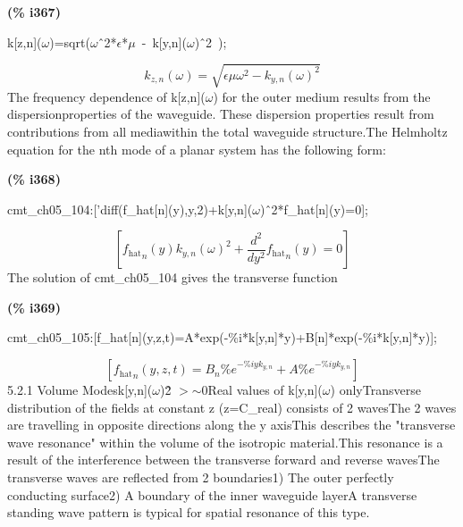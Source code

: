 \documentclass[fleqn]{article}
\begin{document}
\noindent
\begin{minipage}[t]{4.000000em}\color{red}\bfseries
(\% i367)	
\end{minipage}
\begin{minipage}[t]{\textwidth}\color{blue}
k[z,n](\ensuremath{\omega})=sqrt(\ensuremath{\omega}\^\ 2*\ensuremath{\epsilon}*\ensuremath{\mu}\ -\ k[y,n](\ensuremath{\omega})\^\ 2\ );
\end{minipage}
\[\displaystyle \tag{\% o367} 
{k_{z,n}}\left( \omega \right) =\sqrt{\epsilon  \mu  {{\omega }^{2}}-{{{k_{y,n}}\left( \omega \right) }^{2}}}\mbox{}
\]
The frequency dependence of k[z,n](\ensuremath{\omega}) for the outer medium results from the dispersionproperties of the waveguide. These dispersion properties result from contributions from all mediawithin the total waveguide structure.The Helmholtz equation for the nth mode of a planar system has the following form:


\noindent
\begin{minipage}[t]{4.000000em}\color{red}\bfseries
(\% i368)	
\end{minipage}
\begin{minipage}[t]{\textwidth}\color{blue}
cmt\_ch05\_104:['diff(f\_hat[n](y),y,2)+k[y,n](\ensuremath{\omega})\^\ 2*f\_hat[n](y)=0];
\end{minipage}
\[\displaystyle \tag{\% o368} 
\left[ {{{f_{\ensuremath{\mathrm{hat}}}}}_n}(y) {{{k_{y,n}}\left( \omega \right) }^{2}}+\frac{{{d}^{2}}}{d {{y}^{2}}} {{{f_{\ensuremath{\mathrm{hat}}}}}_n}(y)=0\right] \mbox{}
\]
The solution of cmt\_ch05\_104 gives the transverse function


\noindent
\begin{minipage}[t]{4.000000em}\color{red}\bfseries
(\% i369)	
\end{minipage}
\begin{minipage}[t]{\textwidth}\color{blue}
cmt\_ch05\_105:[f\_hat[n](y,z,t)=A*exp(-\%i*k[y,n]*y)+B[n]*exp(-\%i*k[y,n]*y)];
\end{minipage}
\[\displaystyle \tag{\% o369} 
\left[ {{{f_{\ensuremath{\mathrm{hat}}}}}_n}\left( y\operatorname{,}z\operatorname{,}t\right) ={B_n} {{\% e}^{-\% i y {k_{y,n}}}}+A {{\% e}^{-\% i y {k_{y,n}}}}\right] \mbox{}
\]
5.2.1 Volume Modesk[y,n](\ensuremath{\omega})\^ 2 \ensuremath{>}\ensuremath{\sim }0Real values of k[y,n](\ensuremath{\omega}) onlyTransverse distribution of the fields at constant z (z=C\_real) consists of 2 wavesThe 2 waves are travelling in opposite directions along the y axisThis describes the "transverse wave resonance" within the volume of the isotropic material.This resonance is a result of the interference between the transverse forward and reverse wavesThe transverse waves are reflected from 2 boundaries1) The outer perfectly conducting surface2) A boundary of the inner waveguide layerA transverse standing wave pattern is typical for spatial resonance of this type.
\end{document}
